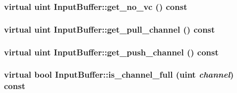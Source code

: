 \hypertarget{classInputBuffer_2a76cc1cf7386e7d9bea7993660e7800}{
\subsubsection[{get\_\-no\_\-vc}]{\setlength{\rightskip}{0pt plus 5cm}virtual {\bf uint} InputBuffer::get\_\-no\_\-vc () const}}
\label{classInputBuffer_2a76cc1cf7386e7d9bea7993660e7800}


\hypertarget{classInputBuffer_b33dddf15a99bb33e22712b23c19cf82}{
\subsubsection[{get\_\-pull\_\-channel}]{\setlength{\rightskip}{0pt plus 5cm}virtual {\bf uint} InputBuffer::get\_\-pull\_\-channel () const}}
\label{classInputBuffer_b33dddf15a99bb33e22712b23c19cf82}


\hypertarget{classInputBuffer_0c13c3b2a56799d78bf0961d74ad03a9}{
\subsubsection[{get\_\-push\_\-channel}]{\setlength{\rightskip}{0pt plus 5cm}virtual {\bf uint} InputBuffer::get\_\-push\_\-channel () const}}
\label{classInputBuffer_0c13c3b2a56799d78bf0961d74ad03a9}


\hypertarget{classInputBuffer_53d9799602c95d0b17b73e4b1d1b73d6}{
\subsubsection[{is\_\-channel\_\-full}]{\setlength{\rightskip}{0pt plus 5cm}virtual bool InputBuffer::is\_\-channel\_\-full ({\bf uint} {\em channel}) const}}
\label{classInputBuffer_53d9799602c95d0b17b73e4b1d1b73d6}


